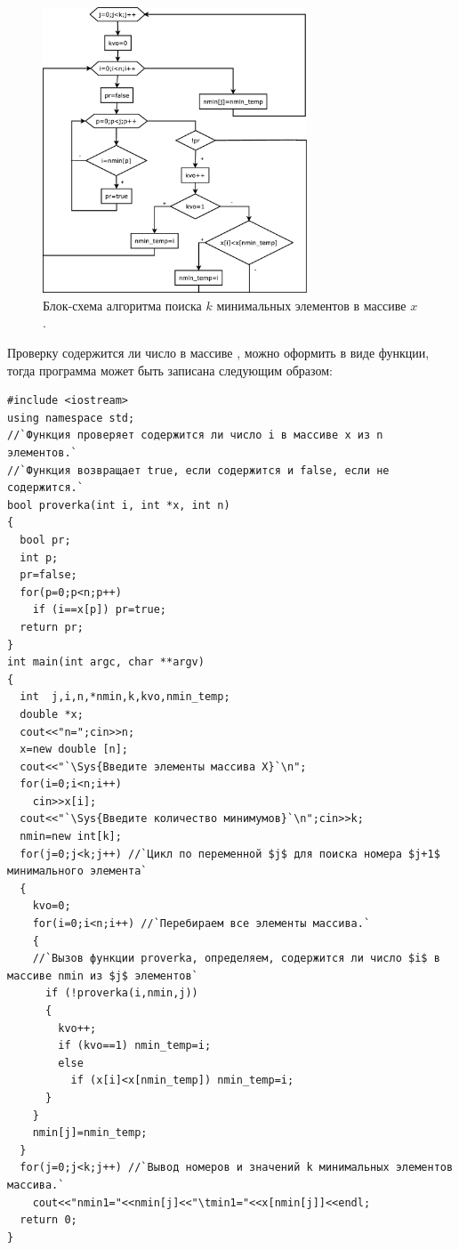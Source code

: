 \begin{figure}[htb]
\begin{center}
\includegraphics[width=0.7\textwidth]{img/ris_5_9}
\caption{Блок-схема алгоритма поиска $k$ минимальных элементов в массиве $x$.}
\label{ch05:refDrawing8}
\end{center}
\end{figure}

Проверку содержится ли число  в массиве , можно оформить в виде функции,
тогда программа может быть записана следующим образом:
\begin{lstlisting}
#include <iostream>
using namespace std;
//`Функция проверяет содержится ли число i в массиве x из n элементов.`
//`Функция возвращает true, если содержится и false, если не содержится.`
bool proverka(int i, int *x, int n)
{
  bool pr;
  int p;
  pr=false;
  for(p=0;p<n;p++)
    if (i==x[p]) pr=true;
  return pr;
}
int main(int argc, char **argv)
{
  int  j,i,n,*nmin,k,kvo,nmin_temp;
  double *x;
  cout<<"n=";cin>>n;
  x=new double [n];
  cout<<"`\Sys{Введите элементы массива Х}`\n";
  for(i=0;i<n;i++)
    cin>>x[i];
  cout<<"`\Sys{Введите количество минимумов}`\n";cin>>k;
  nmin=new int[k];
  for(j=0;j<k;j++) //`Цикл по переменной $j$ для поиска номера $j+1$ минимального элемента`
  {
    kvo=0;
    for(i=0;i<n;i++) //`Перебираем все элементы массива.`
    {
    //`Вызов функции proverka, определяем, содержится ли число $i$ в массиве nmin из $j$ элементов`
      if (!proverka(i,nmin,j)) 
      {
        kvo++;
        if (kvo==1) nmin_temp=i;
        else
          if (x[i]<x[nmin_temp]) nmin_temp=i;
      }
    }
    nmin[j]=nmin_temp;		
  }
  for(j=0;j<k;j++) //`Вывод номеров и значений k минимальных элементов массива.`
    cout<<"nmin1="<<nmin[j]<<"\tmin1="<<x[nmin[j]]<<endl;
  return 0;
}
\end{lstlisting}


